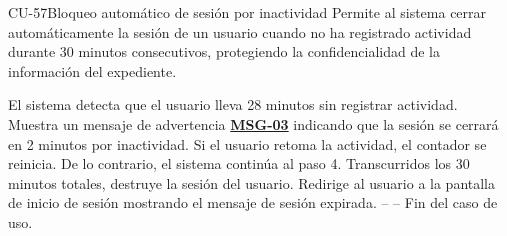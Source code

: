 \begin{UseCase}{CU-57}{Bloqueo automático de sesión por inactividad}{
	Permite al sistema cerrar automáticamente la sesión de un usuario cuando no ha registrado actividad durante 30 minutos consecutivos, protegiendo la confidencialidad de la información del expediente.
}
\end{UseCase}

\begin{UCtrayectoria}
	\UCpaso El sistema detecta que el usuario lleva 28 minutos sin registrar actividad.
	\UCpaso Muestra un mensaje de advertencia \hyperlink{mMSG03}{\bf MSG-03} indicando que la sesión se cerrará en 2 minutos por inactividad.
	\UCpaso[\UCactor] Si el usuario retoma la actividad, el contador se reinicia. De lo contrario, el sistema continúa al paso 4.
	\UCpaso Transcurridos los 30 minutos totales, destruye la sesión del usuario.
	\UCpaso Redirige al usuario a la pantalla de inicio de sesión mostrando el mensaje de sesión expirada.
	\UCpaso[] -- -- Fin del caso de uso.
\end{UCtrayectoria}
